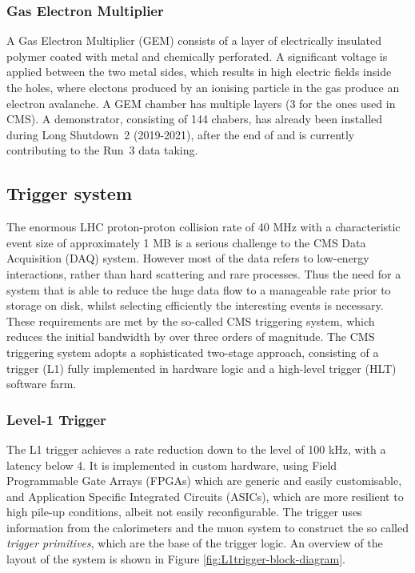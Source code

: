 \subsubsection{Gas Electron Multiplier}
A Gas Electron Multiplier (GEM) consists of a layer of electrically insulated polymer coated with metal and chemically perforated.
A significant voltage is applied between the two metal sides, which results in high electric fields inside the holes,
where electons produced by an ionising particle in the gas produce an electron avalanche.
A GEM chamber has multiple layers (3 for the ones used in CMS).
A demonstrator, consisting of 144 chabers, has already been installed during Long Shutdown~2 (2019-2021), after the end of \RunII and is currently contributing to the Run~3 data taking.

\subsection{Trigger system}
The enormous LHC proton-proton collision rate of 40 MHz with a characteristic event size of approximately 1 MB
is a serious challenge to the CMS Data Acquisition (DAQ) system.
However most of the data refers to low-energy interactions, rather than hard scattering and rare processes.
Thus the need for a system that is able to reduce the huge data flow to a manageable rate prior to storage on disk,
whilst selecting efficiently the interesting events is necessary.
These requirements are met by the so-called CMS triggering system,
which reduces the initial bandwidth by over three orders of magnitude.
The CMS triggering system adopts a sophisticated two-stage approach,
consisting of a \Lone trigger (L1) fully implemented in hardware logic and a high-level trigger (HLT) software farm.

\subsubsection{Level-1 Trigger}
\label{sec:L1trigger}
The L1 trigger achieves a rate reduction down to the level of 100 kHz, with a latency below 4\mus.
It is implemented in custom hardware, using Field Programmable Gate Arrays (FPGAs) which are generic and easily customisable,
and Application Specific Integrated Circuits (ASICs), which are more resilient to high pile-up conditions, albeit not easily reconfigurable.
The \Lone trigger uses information from the calorimeters and the muon system to construct the so called \textit{trigger primitives},
which are the base of the trigger logic.
An overview of the layout of the system is shown in Figure \ref{fig:L1trigger-block-diagram}.

